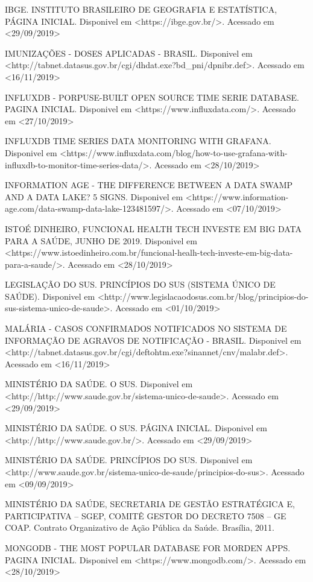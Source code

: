 \documentclass[
	12pt,				%
	openright,			%
	oneside,			%
	a4paper,			%
	chapter=TITLE,		%
	section=TITLE,		%
	subsection=TITLE,	%
	subsubsection=TITLE,%
	english,			%
	brazil				%
	]{abntex2}
\theoremstyle{definition}
\begin{document}
IBGE. INSTITUTO BRASILEIRO DE GEOGRAFIA E ESTATÍSTICA, PÁGINA INICIAL. Disponivel em <https://ibge.gov.br/>. Acessado em <29/09/2019>

IMUNIZAÇÕES - DOSES APLICADAS - BRASIL. Disponivel em <http://tabnet.datasus.gov.br/cgi/dhdat.exe?bd_pni/dpnibr.def>. Acessado em <16/11/2019>

INFLUXDB - PORPUSE-BUILT OPEN SOURCE TIME SERIE DATABASE. PAGINA INICIAL. Disponivel em <https://www.influxdata.com/>. Acessado em <27/10/2019>

INFLUXDB TIME SERIES DATA MONITORING WITH GRAFANA. Disponivel em <https://www.influxdata.com/blog/how-to-use-grafana-with-influxdb-to-monitor-time-series-data/>. Acessado em <28/10/2019>

INFORMATION AGE - THE DIFFERENCE BETWEEN A DATA SWAMP AND A DATA LAKE? 5 SIGNS. Disponivel em <https://www.information-age.com/data-swamp-data-lake-123481597/>. Acessado em <07/10/2019>

ISTOÉ DINHEIRO, FUNCIONAL HEALTH TECH INVESTE EM BIG DATA PARA A SAÚDE, JUNHO DE 2019. Disponivel em <https://www.istoedinheiro.com.br/funcional-healh-tech-investe-em-big-data-para-a-saude/>. Acessado em <28/10/2019>

LEGISLAÇÃO DO SUS. PRINCÍPIOS DO SUS (SISTEMA ÚNICO DE SAÚDE). Disponivel em <http://www.legislacaodosus.com.br/blog/principios-do-sus-sistema-unico-de-saude>. Acessado em <01/10/2019>

MALÁRIA - CASOS CONFIRMADOS NOTIFICADOS NO SISTEMA DE INFORMAÇÃO DE AGRAVOS DE NOTIFICAÇÃO - BRASIL. Disponivel em <http://tabnet.datasus.gov.br/cgi/deftohtm.exe?sinannet/cnv/malabr.def>. Acessado em <16/11/2019>

MINISTÉRIO DA SAÚDE. O SUS. Disponivel em <http://http://www.saude.gov.br/sistema-unico-de-saude>. Acessado em <29/09/2019>

MINISTÉRIO DA SAÚDE. O SUS.  PÁGINA INICIAL. Disponivel em <http://http://www.saude.gov.br/>. Acessado em <29/09/2019>

MINISTÉRIO DA SAÚDE. PRINCÍPIOS DO SUS. Disponivel em <http://www.saude.gov.br/sistema-unico-de-saude/principios-do-sus>. Acessado em <09/09/2019>

MINISTÉRIO DA SAÚDE, SECRETARIA DE GESTÃO ESTRATÉGICA E, PARTICIPATIVA – SGEP, COMITÊ GESTOR DO DECRETO 7508 – GE COAP. Contrato Organizativo de Ação Pública da Saúde. Brasília, 2011.

MONGODB - THE MOST POPULAR DATABASE FOR MORDEN APPS. PAGINA INICIAL. Disponivel em <https://www.mongodb.com/>. Acessado em <28/10/2019>
\end{document}
